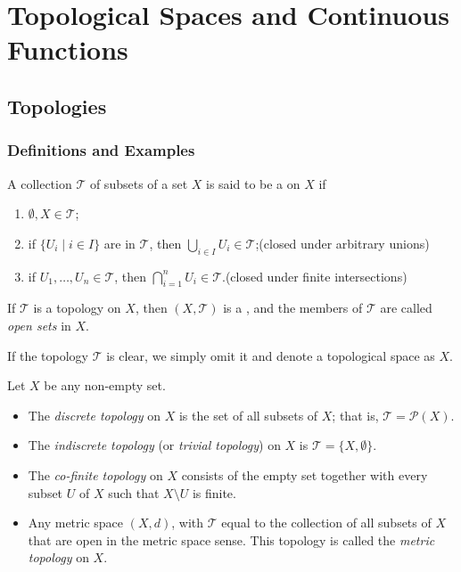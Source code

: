\chapter{Topological Spaces and Continuous Functions}\label{chap:topological-spaces}
\section{Topologies}
\subsection{Definitions and Examples}
\begin{definition}
A collection $\mathcal{T}$ of subsets of a set $X$ is said to be a  on $X$ if
\begin{enumerate}[label=(\roman*)]
\item $\emptyset,X\in\mathcal{T}$;
\item if $\{U_i\mid i\in I\}$ are in $\mathcal{T}$, then $\bigcup_{i\in I}U_i\in\mathcal{T}$;\hfill(closed under arbitrary unions)
\item if $U_1,\dots,U_n\in\mathcal{T}$, then $\bigcap_{i=1}^{n}U_i\in\mathcal{T}$.\hfill(closed under finite intersections)
\end{enumerate}
If $\mathcal{T}$ is a topology on $X$, then $(X,\mathcal{T})$ is a , and the members of $\mathcal{T}$ are called \emph{open sets} in $X$.
\end{definition}

\begin{notation}
If the topology $\mathcal{T}$ is clear, we simply omit it and denote a topological space as $X$.
\end{notation}

\begin{example}
Let $X$ be any non-empty set.
\begin{itemize}
\item The \emph{discrete topology} on $X$ is the set of all subsets of $X$; that is, $\mathcal{T}=\mathcal{P}(X)$.
\item The \emph{indiscrete topology} (or \emph{trivial topology}) on $X$ is $\mathcal{T}=\{X,\emptyset\}$.
\item The \emph{co-finite topology} on $X$ consists of the empty set together with every subset $U$ of $X$ such that $X\setminus U$ is finite.
\item Any metric space $(X,d)$, with $\mathcal{T}$ equal to the collection of all subsets of $X$ that are open in the metric space sense. This topology is called the \emph{metric topology} on $X$.
\end{itemize}
\end{example}

